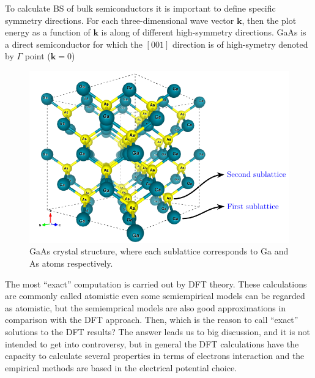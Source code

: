 To calculate \gls{BS} of bulk semiconductors it is important to define specific symmetry directions. For each three-dimensional wave vector $\boldsymbol{k}$, then the plot energy as a function of $\boldsymbol{k}$ is along of different high-symmetry directions\cite{piprek2017handbook}.  GaAs is a direct semiconductor for which the $\left[001\right]$ direction is of high-symetry denoted by $\Gamma$ point ($\boldsymbol{k}=0$)
\begin{figure}[h!]
	\centering
	\includegraphics[width=\linewidth]{../figures/chapter-1/bulk-1/build/bulk-1}
	\caption{
		 GaAs crystal structure, where each sublattice corresponds to Ga and As atoms respectively. }
	\label{fig:subsubsection-1.1.1-bulk-1}
\end{figure}

The most ``exact'' computation is carried out by DFT theory. These calculations are  commonly  called atomistic even some  semiempirical models can be regarded as atomistic, but the semiemprical models are also good approximations in comparison with the DFT approach. Then, which is the reason to call ``exact'' solutions to the DFT results? The answer leads us to big discussion, and it is not intended to get into controversy,  but in general the DFT calculations have the capacity to calculate several properties in terms of electrons interaction and the empirical methods are based in the electrical potential choice.\\
 

